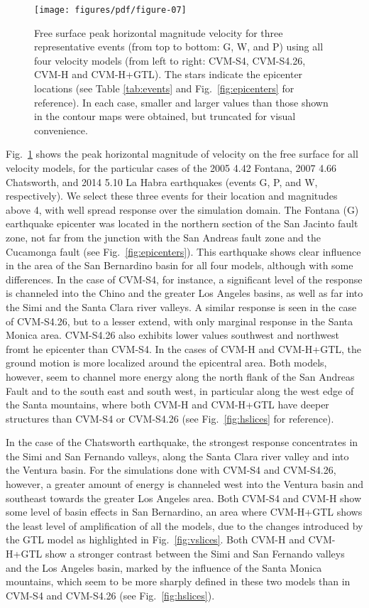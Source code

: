 \begin{figure}
    \centering
    \texttt{[image: figures/pdf/figure-07]}
    \caption{Free surface peak horizontal magnitude velocity for three representative events (from top to bottom: G, W, and P) using all four velocity models (from left to right: CVM-S4, CVM-S4.26, CVM-H and CVM-H+GTL). The stars indicate the epicenter locations (see Table \ref{tab:events} and Fig.~\ref{fig:epicenters} for reference). In each case, smaller and larger values than those shown in the contour maps were obtained, but truncated for visual convenience.}
    \label{fig:selected.pgvs}
\end{figure}

Fig.~\ref{fig:selected.pgvs} shows the peak horizontal magnitude of velocity on the free surface for all velocity models, for the particular cases of the 2005  4.42 Fontana, 2007  4.66 Chatsworth, and 2014  5.10 La Habra earthquakes (events G, P, and W, respectively). We select these three events for their location and magnitudes above 4, with well spread response over the simulation domain. The Fontana (G) earthquake epicenter was located in the northern section of the San Jacinto fault zone, not far from the junction with the San Andreas fault zone and the Cucamonga fault (see Fig.~\ref{fig:epicenters}). This earthquake shows clear influence in the area of the San Bernardino basin for all four models, although with some differences. In the case of CVM-S4, for instance, a significant level of the response is channeled into the Chino and the greater Los Angeles basins, as well as far into the Simi and the Santa Clara river valleys. A similar response is seen in the case of CVM-S4.26, but to a lesser extend, with only marginal response in the Santa Monica area. CVM-S4.26 also exhibits lower values southwest and northwest fromt he epicenter than CVM-S4. In the cases of CVM-H and CVM-H+GTL, the ground motion is more localized around the epicentral area. Both models, however, seem to channel more energy along the north flank of the San Andreas Fault and to the south east and south west, in particular along the west edge of the Santa mountains, where both CVM-H and CVM-H+GTL have deeper structures than CVM-S4 or CVM-S4.26 (see Fig.~\ref{fig:hslices} for reference).

In the case of the Chatsworth earthquake, the strongest response concentrates in the Simi and San Fernando valleys, along the Santa Clara river valley and into the Ventura basin. For the simulations done with CVM-S4 and CVM-S4.26, however, a greater amount of energy is channeled west into the Ventura basin and southeast towards the greater Los Angeles area. Both CVM-S4 and CVM-H show some level of basin effects in San Bernardino, an area where CVM-H+GTL shows the least level of amplification of all the models, due to the changes introduced by the GTL model as highlighted in Fig.~\ref{fig:vslices}. Both CVM-H and CVM-H+GTL show a stronger contrast between the Simi and San Fernando valleys and the Los Angeles basin, marked by the influence of the Santa Monica mountains, which seem to be more sharply defined in these two models than in CVM-S4 and CVM-S4.26 (see Fig.~\ref{fig:hslices}).

